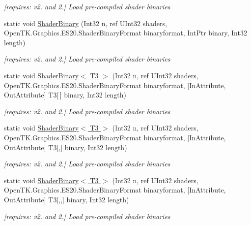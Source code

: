 \begin{DoxyCompactItemize}
\begin{DoxyCompactList}\small\item\em \mbox{[}requires\-: v2. and 2.\mbox{]} Load pre-\/compiled shader binaries \end{DoxyCompactList}\item 
static void \hyperlink{class_open_t_k_1_1_graphics_1_1_e_s20_1_1_g_l_a362dae70945efb256874668916424724}{Shader\-Binary} (Int32 n, ref U\-Int32 shaders, Open\-T\-K.\-Graphics.\-E\-S20.\-Shader\-Binary\-Format binaryformat, Int\-Ptr binary, Int32 length)
\begin{DoxyCompactList}\small\item\em \mbox{[}requires\-: v2. and 2.\mbox{]} Load pre-\/compiled shader binaries \end{DoxyCompactList}\item 
static void \hyperlink{class_open_t_k_1_1_graphics_1_1_e_s20_1_1_g_l_a76f851573e3e04108dd0a3a6be4b4d9e}{Shader\-Binary$<$ T3 $>$} (Int32 n, ref U\-Int32 shaders, Open\-T\-K.\-Graphics.\-E\-S20.\-Shader\-Binary\-Format binaryformat, \mbox{[}In\-Attribute, Out\-Attribute\mbox{]} T3\mbox{[}$\,$\mbox{]} binary, Int32 length)
\begin{DoxyCompactList}\small\item\em \mbox{[}requires\-: v2. and 2.\mbox{]} Load pre-\/compiled shader binaries \end{DoxyCompactList}\item 
static void \hyperlink{class_open_t_k_1_1_graphics_1_1_e_s20_1_1_g_l_aa76d032c1bcde5293843ffee805b052c}{Shader\-Binary$<$ T3 $>$} (Int32 n, ref U\-Int32 shaders, Open\-T\-K.\-Graphics.\-E\-S20.\-Shader\-Binary\-Format binaryformat, \mbox{[}In\-Attribute, Out\-Attribute\mbox{]} T3\mbox{[},\mbox{]} binary, Int32 length)
\begin{DoxyCompactList}\small\item\em \mbox{[}requires\-: v2. and 2.\mbox{]} Load pre-\/compiled shader binaries \end{DoxyCompactList}\item 
static void \hyperlink{class_open_t_k_1_1_graphics_1_1_e_s20_1_1_g_l_a708de810c05d1031768d5d1d91f7661e}{Shader\-Binary$<$ T3 $>$} (Int32 n, ref U\-Int32 shaders, Open\-T\-K.\-Graphics.\-E\-S20.\-Shader\-Binary\-Format binaryformat, \mbox{[}In\-Attribute, Out\-Attribute\mbox{]} T3\mbox{[},,\mbox{]} binary, Int32 length)
\begin{DoxyCompactList}\small\item\em \mbox{[}requires\-: v2. and 2.\mbox{]} Load pre-\/compiled shader binaries \end{DoxyCompactList}\item 

\end{DoxyCompactItemize}
